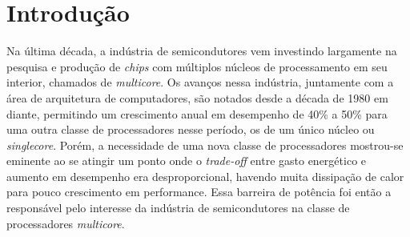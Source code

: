 
\newcommand{\multicore}{\textit{multicore}\xspace}
\newcommand{\chip}{\textit{chip}\xspace}
\newcommand{\chips}{\textit{chips}\xspace}
\newcommand{\singlecore}{\textit{singlecore}\xspace}
\newcommand{\tradeoff}{\textit{trade-off}\xspace}
\newcommand{\exaescale}{\textit{Exaescale}\xspace}
\newcommand{\greencomputing}{\textit{Green Computing}\xspace}  
\newcommand{\ranking}{\textit{ranking}\xspace}
\newcommand{\bench}{\textit{benchmark}\xspace}
\newcommand{\capb}{CAP Bench\xspace}
\newcommand{\etal}{\textit{et al}.\xspace}
\newcommand{\thread}{\textit{thread}\xspace}
\newcommand{\threads}{\textit{threads}\xspace}
\newcommand{\cache}{\textit{cache}\xspace}
\newcommand{\caches}{\textit{caches}\xspace}
\newcommand{\byte}{\textit{byte}\xspace}
\newcommand{\bytes}{\textit{bytes}\xspace}
\newcommand{\hardware}{\textit{hardware}\xspace}
\newcommand{\transistor}{\textit{transistor}\xspace}
\newcommand{\transistors}{\textit{transistors}\xspace}
\newcommand{\manycore}{\textit{manycore}\xspace}
\newcommand{\hardware}{\textit{hardware}\xspace}
\newcommand{\mppa}{MPPA-256\xspace}

\chapter{Introdução}
\label{ch:introdução}

Na última década, a indústria de semicondutores vem investindo largamente na pesquisa e produção de \chips com múltiplos núcleos de processamento em seu interior, chamados de \multicore. Os avanços nessa indústria, juntamente com a área de arquitetura de computadores, são notados desde a década de 1980 em diante, permitindo um crescimento anual em desempenho de 40\% a 50\% \cite{Larus2008} para uma outra classe de processadores nesse período, os de um único núcleo ou \singlecore. Porém, a necessidade de uma nova classe de processadores mostrou-se eminente ao se atingir um ponto onde o \tradeoff entre gasto energético e aumento em desempenho era desproporcional, havendo muita dissipação de calor para pouco crescimento em performance. Essa barreira de potência foi então a responsável pelo interesse da indústria de semicondutores na classe de processadores \multicore. 

